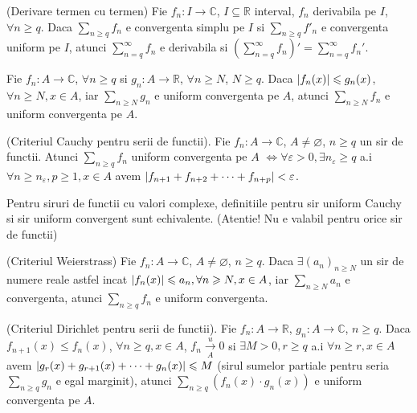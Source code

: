 \documentclass{article}
\begin{document}
\begin{enumerate}
\begin{tcolorbox}
  \teorema (Derivare termen cu termen) Fie $f_n : I \to \mathbb{C}$, $I \subseteq \mathbb{R}$ interval, $f_n$ derivabila pe $I$, $\forall n \geq q$. Daca $\sum_{n \geq q}f_n$ e convergenta simplu pe $I$ si $\sum_{n \geq q} f'_n$ e convergenta uniform pe $I$, atunci $\sum_{n = q}^{\infty} f_n$ e derivabila si $\left(\sum_{n = q}^{\infty} f_n \right)' = \sum_{n = q}^{\infty} f_n'$.
\end{tcolorbox}



  \propozitie Fie $f_n : A \to \mathbb{C}$, $\forall n \geq q$ si $g_n : A \to \mathbb{R}$, $\forall n \geq N$, $N \geq q$. Daca $\left\lvert f_n(x) \right\rvert \leqslant g_n(x)$, $\forall n \geq N, x \in A$, iar $\sum_{n \geq N} g_n$ e uniform convergenta pe $A$, atunci $\sum_{n \geq N} f_n$ e uniform convergenta pe $A$.

  \propozitie (Criteriul Cauchy pentru serii de functii). Fie $f_n : A \to \mathbb{C}$, $A \neq \varnothing$, $n \geq q$ un sir de functii. Atunci $\sum_{n \geq q} f_n$ uniform convergenta pe $A$ $\Leftrightarrow \forall \varepsilon > 0, \exists n_{\varepsilon} \geq q$ a.i $\forall n \geq n_{\varepsilon}, p \geq 1, x \in A$ avem $\left\lvert f_{n+1} + f_{n+2} + \dots + f_{n + p} \right\rvert < \varepsilon$.

  \observatie Pentru siruri de functii cu valori complexe, definitiile pentru sir uniform Cauchy si sir uniform convergent sunt echivalente. (Atentie! Nu e valabil pentru orice sir de functii)

  
\begin{tcolorbox}
  \propozitie (Criteriul Weierstrass) Fie $f_n : A \to \mathbb{C}$, $A \neq \varnothing$, $n \geq q$. Daca $\exists (a_n)_{n \geq N}$ un sir de numere reale astfel incat $\left\lvert f_n(x) \right\rvert \leqslant a_n, \forall n \geqslant N, x \in A$, iar $\sum_{n \geq N} a_n$ e convergenta, atunci $\sum_{n \geq q} f_n$ e uniform convergenta.
\end{tcolorbox}

  \propozitie (Criteriul Dirichlet pentru serii de functii). Fie $f_n : A \to \mathbb{R}$, $g_n : A \to \mathbb{C}$, $n \geq q$. Daca $f_{n+1}(x) \leq f_n(x)$, $\forall n \geq q, x \in A$, $f_n \xrightarrow[A]{u} 0$ si $\exists M > 0, r \geq q$ a.i $\forall n \geq r, x \in A$ avem $\left\lvert g_r(x) + g_{r+1}(x) + \dots + g_n(x) \right\rvert \leqslant M$ (sirul sumelor partiale pentru seria $\sum_{n \geq q} g_n$ e egal marginit), atunci $\sum_{n \geq q} \left(f_n(x) \cdot g_n(x)\right)$ e uniform convergenta pe $A$.


\end{enumerate}
\end{document}
